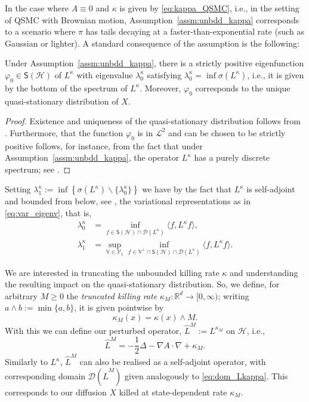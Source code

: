 \documentclass{aptpub}
\newcommand{\Rd}{\mathbb R^d}
\newcommand{\Lk}{L^\kappa}
\newcommand{\lkap}{\lambda_0^\kappa}
\newcommand{\Dom}{\mathcal D}
\renewcommand{\H}{\mathcal H}
\begin{document}
In the case where $A\equiv0$ and $\kappa$ is given by \eqref{eq:kappa_QSMC}, i.e., in the setting of QSMC with Brownian motion, Assumption~\ref{assm:unbdd_kappa} corresponds to a scenario where $\pi$ has tails decaying at a faster-than-exponential rate (such as Gaussian or lighter).
A standard consequence of the assumption is the following:
\begin{lemma}
Under Assumption~\ref{assm:unbdd_kappa}, there is a strictly positive eigenfunction $\varphi_0 \in \mathsf S(\H)$ of $L^\kappa$ with eigenvalue $\lambda_0^\kappa$ satisfying 
$\lambda_0^\kappa = \inf \sigma(\Lk)$, i.e., it is given by the bottom of the spectrum of $\Lk$. Moreover, $\varphi_0$ corresponds to the unique quasi-stationary distribution of $X$.
\end{lemma}
\begin{proof}
    Existence and uniqueness of the quasi-stationary distribution follows from \cite[Theorem 4.5]{Champagnat2017}. Furthermore, that the function $\varphi_0$ is in $\mathcal L^2$ and can be chosen to be strictly positive follows, for instance, from the fact that under Assumption~\ref{assm:unbdd_kappa}, the operator $L^\kappa$ has a purely discrete spectrum; see \cite[Theorems~XIII.67~and~XIII.44]{Reed1978}.
\end{proof}
\begin{remark}
    Setting $\lambda_1^\kappa := \inf\left \{\sigma(L^\kappa)\backslash \{\lambda^\kappa_0\} \right \}$ we have by the fact that 
$\Lk$ is self-adjoint and bounded from below, see \cite[Theorem XIII.1]{Reed1978}, the variational representations as in \eqref{eq:var_eigenv}, that is,
    \begin{equation*}
        \begin{split}
            \lkap &= \inf_{f\in \mathsf S(\H)\cap \Dom(\Lk)} \langle f,\Lk f\rangle,\\
            \lambda_1^\kappa &= \sup_{\mathbb V \in \mathcal V_1} \inf_{f\in \mathbb V^\perp \cap \mathsf S(\H)\cap \Dom(\Lk)} \langle f, \Lk f\rangle.
        \end{split}
    \end{equation*} 
\end{remark}

We are interested in truncating the unbounded killing rate $\kappa$ and understanding the resulting impact on the quasi-stationary distribution. So, we define, for arbitrary $M\ge 0$ the \textit{truncated killing rate} $\kappa_M:\Rd\to [0,\infty)$; writing $a\wedge b := \min\{a,b\}$, it is given pointwise by
\begin{equation*}
    \kappa_M(x) = \kappa(x) \wedge M.
\end{equation*}
With this we can define our perturbed operator, $\widehat{L}^M :=L^{\kappa_M}$ on $\H$, i.e., 
\begin{equation}
    \widehat{L}^M = -\frac 1 2 \Delta - \nabla A \cdot \nabla + \kappa_M.
    \label{eq: ger_pert}
\end{equation}
Similarly to $\Lk$, $\widehat{L}^M$ can also be realised as a self-adjoint operator, with corresponding domain $\Dom (\widehat{L}^M)$ given analogously to \eqref{eq:dom_Lkappa}. This corresponds to our diffusion $X$ killed at state-dependent rate $\kappa_M$.
\end{document}
